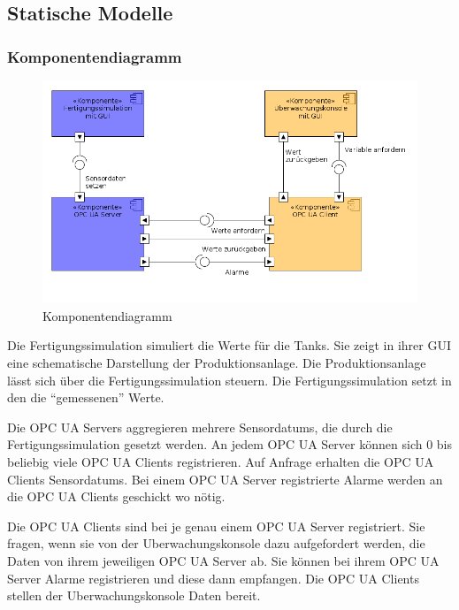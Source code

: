 \documentclass[parskip=full]{scrartcl}
\begin{document}
\subsection{Statische Modelle}
\subsubsection{Komponentendiagramm}
\begin{figure}[H]
  \centering
  \includegraphics[scale=0.5]{media/ComponentDiagram/componentDiagram.png}
  \caption{Komponentendiagramm}
\end{figure}

Die \gls{Fertigungssimulation} simuliert die Werte f\"ur die Tanks. Sie zeigt in ihrer \gls{GUI} eine schematische Darstellung der
\gls{Produktionsanlage}. Die \gls{Produktionsanlage} l\"asst sich \"uber die \gls{Fertigungssimulation} steuern. Die \gls{Fertigungssimulation} setzt
in den  die "`gemessenen"' Werte.

Die \glspl{OPC UA Server} aggregieren mehrere \glspl{Sensordatum}, die durch die \gls{Fertigungssimulation} gesetzt werden. An jedem \gls{OPC UA Server} k\"onnen
sich 0 bis beliebig viele \glspl{OPC UA Client} registrieren. Auf Anfrage erhalten die \glspl{OPC UA Client} \glspl{Sensordatum}. Bei einem \gls{OPC UA Server} registrierte
Alarme werden an die \glspl{OPC UA Client} geschickt wo n\"otig.

Die \glspl{OPC UA Client} sind bei je genau einem \gls{OPC UA Server} registriert. Sie fragen, wenn sie von der \gls{Uberwachungskonsole} dazu
aufgefordert werden, die Daten von ihrem jeweiligen \gls{OPC UA Server} ab. Sie k\"onnen bei ihrem \gls{OPC UA Server} Alarme registrieren und diese
dann empfangen. Die \glspl{OPC UA Client} stellen der \gls{Uberwachungskonsole} Daten bereit.
\end{document}
